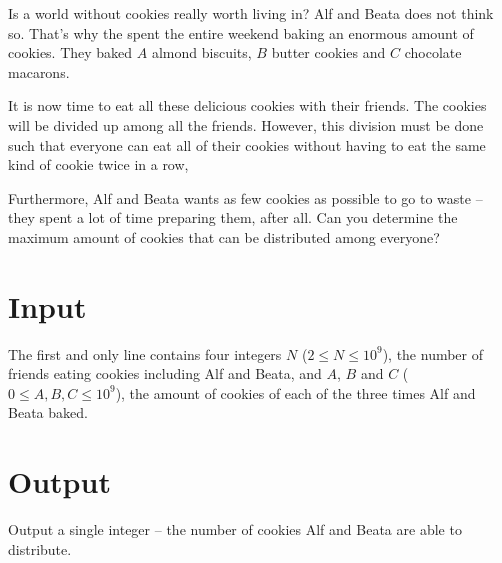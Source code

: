 Is a world without cookies really worth living in?
Alf and Beata does not think so.
That's why the spent the entire weekend baking an enormous amount of cookies.
They baked $A$ almond biscuits, $B$ butter cookies and $C$ chocolate macarons.

It is now time to eat all these delicious cookies with their friends.
The cookies will be divided up among all the friends.
However, this division must be done such that everyone can eat all of their cookies without having to eat the same kind of cookie twice in a row,

Furthermore, Alf and Beata wants as few cookies as possible to go to waste -- they spent a lot of time preparing them, after all.
Can you determine the maximum amount of cookies that can be distributed among everyone?

\section*{Input}
The first and only line contains four integers $N$ ($2 \le N \le 10^9$), the number of friends eating cookies including Alf and Beata, and $A$, $B$ and $C$ ($0 \le A, B, C \le 10^9$), the amount of cookies of each of the three times Alf and Beata baked.

\section*{Output}
Output a single integer -- the number of cookies Alf and Beata are able to distribute.
